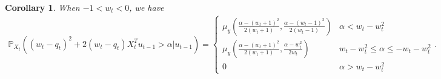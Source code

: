 \documentclass[journal,onecolumn,11pt,final]{IEEEtran}
\newcommand{\1}{\mathbb{1}}
\newcommand{\R}{\mathbb{R}}
\theoremstyle{plain}
\theoremstyle{definition}
\theoremstyle{plain}
\theoremstyle{plain}
\newtheorem{lemma}[theorem]{Lemma}
\newtheorem{corollary}[theorem]{Corollary}
\theoremstyle{definition}
\renewcommand{\P}{\mathbb{P}}
\renewcommand{\R}{\mathbb{R}}
\begin{document}
\begin{corollary}\label{corr: 1-cdf increments, neg w}
	When \(-1 < w_t < 0\), we have
	\begin{align*}
		\P_{X_t}\left( (w_t - q_t)^2 + 2(w_t - q_t)X_t^T u_{t-1} > \alpha \Big| u_{t-1} \right) = \left\{
			\begin{array}{ll}
			      \mu_y\left( \frac{\alpha - (w_t + 1)^2}{2(w_t + 1)}, \frac{\alpha - (w_t - 1)^2}{2(w_t - 1)} \right) & \alpha < w_t - w_t^2 \\
			      \mu_y\left( \frac{\alpha - (w_t + 1)^2}{2(w_t + 1)}, \frac{\alpha - w_t^2}{2w_t} \right) &  w_t - w_t^2 \leq \alpha \leq -w_t - w_t^2\\
			      0 & \alpha > w_t - w_t^2
			\end{array} .
			\right. 
	\end{align*}
\end{corollary}

%
\end{document}

